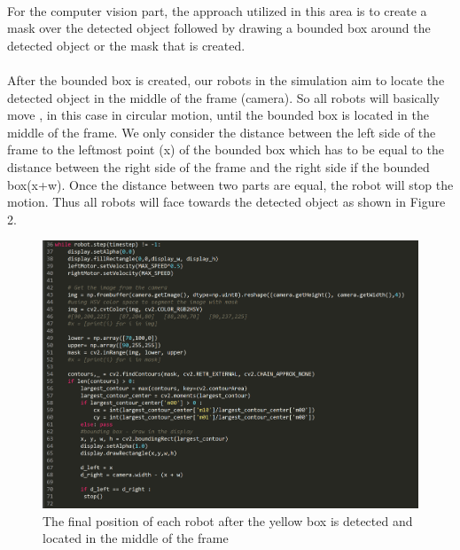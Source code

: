 \paragraph*{}
For the computer vision part, the approach utilized in this area is to create a mask over the detected object followed by drawing a bounded box around the detected object or the mask that is created.

\paragraph*{}
After the bounded box is created, our robots in the simulation aim to locate the detected object in the middle of the frame (camera). So all robots will basically move , in this case in circular motion, until the bounded box is located in the middle of the frame. We only consider the distance between the left side of the frame to the leftmost point (x) of the bounded box which has to be equal to the distance between the right side of the frame and the right side if the bounded box(x+w). Once the distance between two parts are equal, the robot will stop the motion. Thus all robots will face towards the detected object as shown in Figure 2.

\begin{figure}[H]
    \centering
    \includegraphics[width=0.6\linewidth]{assets/images/object_detection/figure1.png}
    \caption{The final position of each robot after the yellow box is detected and located in the middle of the frame}
    \label{fig:object detection figure 2.} 
\end{figure}
